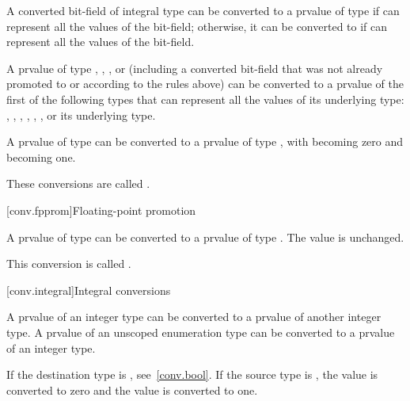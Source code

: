 \pnum
A converted bit-field of integral type can be converted
to a prvalue of type  if  can represent all the
values of the bit-field; otherwise, it can be converted to
 if  can represent all the
values of the bit-field.

\pnum
{}%
%
%
A prvalue of type
, , , or
(including a converted bit-field that was not
already promoted to  or 
according to the rules above)
can be converted to a prvalue
of the first of the following types that can represent all the values of
its underlying type:
,
,
,
,
,
, or
its underlying type.

\pnum
{}%
A prvalue of type  can be converted to a prvalue of type
, with  becoming zero and  becoming
one.

\pnum
These conversions are called .

[conv.fpprom]{Floating-point promotion}

\pnum
{}%
A prvalue of type  can be converted to a prvalue of type
. The value is unchanged.

\pnum
This conversion is called .

[conv.integral]{Integral conversions}

\pnum
{}%
A prvalue of an integer type can be converted to a prvalue of another
integer type. A prvalue of an unscoped enumeration type can be converted to
a prvalue of an integer type.

\pnum
{}%
If the destination type is , see~\ref{conv.bool}. If the
source type is , the value  is converted to
zero and the value  is converted to one.

